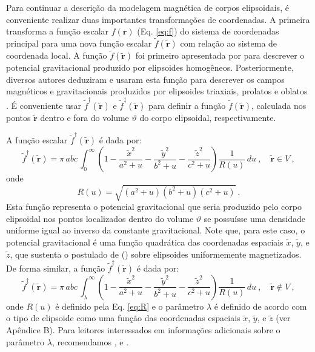 Para continuar a descrição da modelagem magnética de corpos elipsoidais, é conveniente realizar duas importantes transformações de coordenadas. A primeira  transforma a função escalar $f(\mathbf{r})$ (Eq. \ref{eq:f}) do sistema de coordenadas principal para uma nova função escalar $\tilde{f}(\tilde{\mathbf{r}})$ com relação ao sistema de coordenada local.
A função $\tilde{f}(\tilde{\mathbf{r}})$ foi primeiro apresentada por \citet{dirichlet1839} para descrever o potencial gravitacional produzido por elipsoides homogêneos. Posteriormente, diversos autores deduziram e usaram esta função para descrever os campos magnéticos e gravitacionais produzidos por elipsoides triaxiais, prolatos e oblatos \citep{maxwell1873, thomson1879, dubois1896, peirce1902, webster1904, kellogg1929, stoner1945, osborn1945, lowes1974,  peake1953, chang1961, clark1986, tejedor1995, sttraton2007}.
É conveniente usar $\tilde{f}^{\dagger}(\tilde{\mathbf{r}})$
e $\tilde{f}^{\ddagger}(\tilde{\mathbf{r}})$ para definir a função $\tilde{f}(\tilde{\mathbf{r}})$, calculada nos pontos $\tilde{\mathbf{r}}$ dentro e fora do volume $\vartheta$ do corpo elipsoidal, respectivamente.

A função escalar $\tilde{f}^{\dagger}(\tilde{\mathbf{r}})$
é dada por:
\begin{equation}
\tilde{f}^{\dagger}(\tilde{\mathbf{r}}) = \pi \, abc \, 
\int_{0}^{\infty} \left( 1 
- \frac{\tilde{x}^{2}}{a^{2} + u} 
- \frac{\tilde{y}^{2}}{b^{2} + u}
- \frac{\tilde{z}^{2}}{c^{2} + u} \right)
\frac{1}{R(u)} \, du \: , \quad \tilde{\mathbf{r}} \in V \: ,
\label{eq:fi-tilde}
\end{equation}
onde
\begin{equation}
R(u) = \sqrt{\left( a^{2} + u \right)\left( b^{2} + u \right)\left( c^{2} + u \right)} \: .
\label{eq:R}
\end{equation}
Esta função representa o potencial gravitacional que seria produzido pelo corpo elipsoidal nos pontos localizados dentro do volume $\vartheta$ se possuísse uma densidade uniforme igual ao inverso da constante gravitacional. Note que, para este caso, o potencial gravitacional é uma função quadrática das coordenadas espaciais $\tilde{x}$, $\tilde{y}$, e $\tilde{z}$, que sustenta o postulado de \citeauthor{maxwell1873} (\citeyear{maxwell1873}) sobre elipsoides uniformemente magnetizados. De forma similar, a função $\tilde{f}^{\ddagger}(\tilde{\mathbf{r}})$ é dada por:
\begin{equation}
\tilde{f}^{\ddagger}(\tilde{\mathbf{r}}) = \pi \, abc \, 
\int_{\lambda}^{\infty} \left( 1 
- \frac{\tilde{x}^{2}}{a^{2} + u} 
- \frac{\tilde{y}^{2}}{b^{2} + u}
- \frac{\tilde{z}^{2}}{c^{2} + u} \right)
\frac{1}{R(u)} \, du \: , \quad \tilde{\mathbf{r}} \not\in V \: ,
\label{eq:fe-tilde}
\end{equation}
onde $R(u)$ é definido pela Eq. \ref{eq:R} e o parâmetro $\lambda$ é definido de acordo com o tipo de elipsoide como uma função das coordenadas espaciais $\tilde{x}$, $\tilde{y}$, e $\tilde{z}$ (ver Apêndice B). Para leitores interessados em informações adicionais sobre o parâmetro $\lambda$, recomendamos \citet[p.~234]{webster1904}, \citet[p.~184]{kellogg1929} e \citet{clark1986}.

